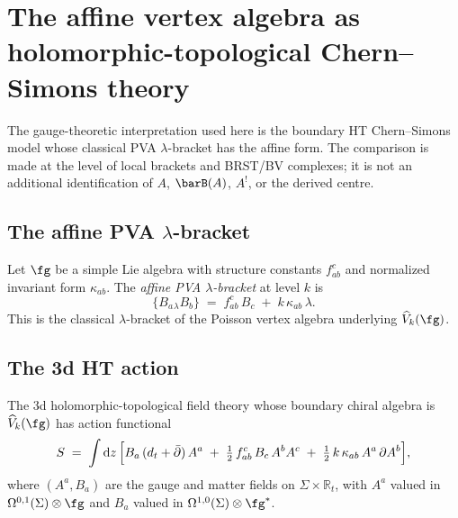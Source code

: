 \section{The affine vertex algebra as holomorphic-topological
Chern--Simons theory}
\label{sec:affine-ht-chern-simons}

The gauge-theoretic interpretation used here is the boundary HT
Chern--Simons model whose classical PVA $\lambda$-bracket has the
affine form.  The comparison is made at the level of local brackets and
BRST/BV complexes; it is not an additional identification of
$A$, $\barB(A)$, $A^!$, or the derived centre.

\subsection{The affine PVA \texorpdfstring{$\lambda$}{lambda}-bracket}

\begin{definition}
\label{def:affine-pva-lambda-bracket}
Let $\fg$ be a simple Lie algebra with structure constants
$f^c_{ab}$ and normalized invariant form $\kappa_{ab}$. The \emph{affine PVA
$\lambda$-bracket} at level $k$ is
\begin{equation}\label{eq:affine-pva-lambda-bracket}
 \{B_a \mathbin{{}_\lambda} B_b\}
 \;=\;
 f^c_{ab}\, B_c \;+\; k\,\kappa_{ab}\,\lambda.
\end{equation}
This is the classical $\lambda$-bracket of the Poisson vertex
algebra underlying $\widehat{V}_k(\fg)$.
\end{definition}

\subsection{The 3d HT action}

\begin{proposition}
\label{prop:affine-cs-action}
The 3d holomorphic-topological field theory whose boundary chiral
algebra is $\widehat{V}_k(\fg)$ has action functional
\begin{equation}\label{eq:affine-cs-action}
 S
 \;=\;
 \int \mathrm{d}z\,
 \Bigl[
 B_a\,(d_t + \bar{\partial})\,A^a
 \;+\;
 \tfrac{1}{2}\,f^c_{ab}\,B_c\,A^b A^c
 \;+\;
 \tfrac{1}{2}\,k\,\kappa_{ab}\,A^a\,\partial A^b
 \Bigr],
\end{equation}
where $(A^a, B_a)$ are the gauge and matter fields on
$\Sigma \times \mathbb{R}_t$, with $A^a$ valued in
$\Omega^{0,1}(\Sigma) \otimes \fg$ and $B_a$ valued in
$\Omega^{1,0}(\Sigma) \otimes \fg^*$.
\end{proposition}


